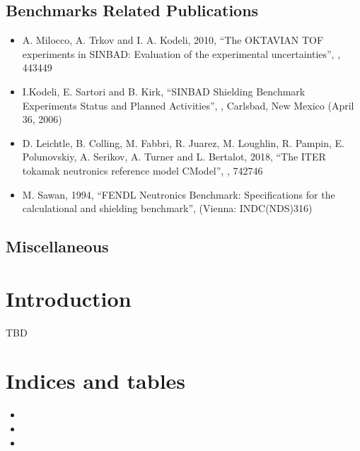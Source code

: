 \documentclass[letterpaper,10pt,english]{sphinxmanual}
\begin{document}
\section{Benchmarks Related Publications}
\label{\detokenize{publications:benchmarks-related-publications}}\begin{itemize}
\item {} 
A. Milocco, A. Trkov and I. A. Kodeli, 2010, “The OKTAVIAN TOF experiments in SINBAD: Evaluation of the
experimental uncertainties”, ,  443\sphinxhyphen{}449

\item {} 
I.Kodeli, E. Sartori and B. Kirk, “SINBAD \sphinxhyphen{} Shielding Benchmark Experiments \sphinxhyphen{} Status and Planned Activities”,
,
Carlsbad, New Mexico (April 3\sphinxhyphen{}6, 2006)

\item {} 
D. Leichtle, B. Colling, M. Fabbri, R. Juarez, M. Loughlin,
R. Pampin, E. Polunovskiy, A. Serikov, A. Turner and L. Bertalot, 2018,
“The ITER tokamak neutronics reference model C\sphinxhyphen{}Model”,
,  742\sphinxhyphen{}746

\item {} 
M. Sawan, 1994,  “FENDL Neutronics Benchmark: Specifications for the calculational and shielding benchmark”,
(Vienna: INDC(NDS)\sphinxhyphen{}316)

\end{itemize}


\section{Miscellaneous}
\label{\detokenize{publications:miscellaneous}}

\chapter{Introduction}
\label{\detokenize{dev/intro:introduction}}\label{\detokenize{dev/intro::doc}}
TBD


\chapter{Indices and tables}
\label{\detokenize{index:indices-and-tables}}\begin{itemize}
\item {} 

\item {} 

\item {} 

\end{itemize}



\renewcommand{\indexname}{Index}
\printindex
\end{document}
